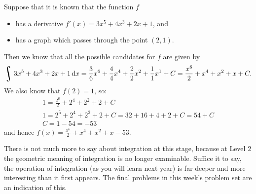\begin{ex}
  Suppose that it is known that the function $ f $
  \begin{itemize}
    \item has a derivative $ f'(x) = 3x^5 + 4x^3 + 2x + 1 $, and
    \item has a graph which passes through the point $ (2,1) $.
  \end{itemize}
  Then we know that all the possible candidates for $ f $ are given by
  \begin{displaymath}
    \rint 3x^5 + 4x^3 + 2x + 1 \dif{x} = \frac{3}{6}x^6 + \frac{4}{4}x^4 + \frac{2}{2}x^2 + \frac{1}{1}x^1 + C = \frac{x^6}{2} + x^4 + x^2 + x + C.
  \end{displaymath}
  We also know that $ f(2) = 1 $, so:
  \begin{gather*}
    1 = \frac{2^6}{2} + 2^4 + 2^2 + 2 + C \\
    1 = 2^5 + 2^4 + 2^2 + 2 + C = 32 + 16 + 4 + 2 + C = 54 + C\\
    C = 1 - 54 = -53
  \end{gather*}
  and hence $ f(x) = \frac{x^6}{2} + x^4 + x^2 + x - 53 $.
\end{ex}

There is not much more to say about integration at this stage, because at Level 2 the geometric meaning of integration is no
longer examinable. Suffice it to say, the operation of integration (as you will learn next year) is far deeper and more interesting
than it first appears. The final problems in this week's problem set are an indication of this.

